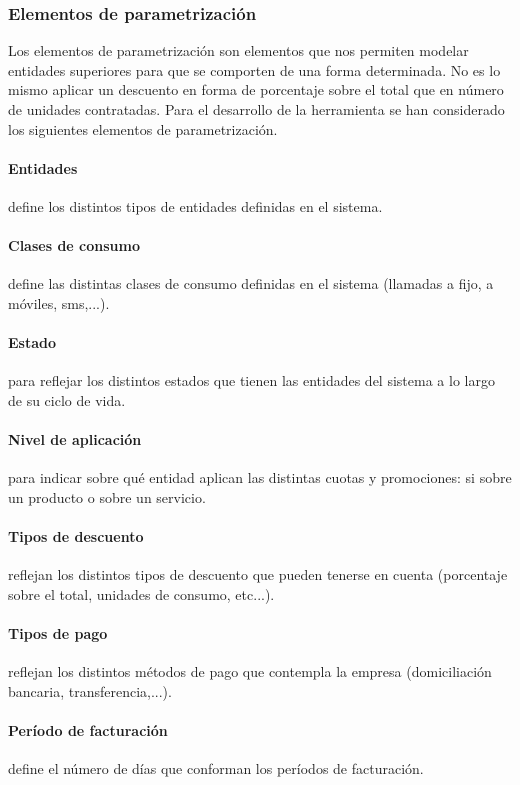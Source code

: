 \subsubsection{Elementos de parametrización}
\label{sub:parametrizacion}
Los elementos de parametrización son elementos que nos permiten modelar entidades superiores para que se comporten de una forma determinada. No es lo mismo aplicar un descuento en forma de porcentaje sobre el total que en número de unidades contratadas. Para el desarrollo de la herramienta se han considerado los siguientes elementos de parametrización.

\paragraph{Entidades} define los distintos tipos de entidades definidas en el sistema.
\paragraph{Clases de consumo} define las distintas clases de consumo definidas en el sistema (llamadas a fijo, a móviles, sms,...).
\paragraph{Estado} para reflejar los distintos estados que tienen las entidades del sistema a lo largo de su ciclo de vida.
\paragraph{Nivel de aplicación} para indicar sobre qué entidad aplican las distintas cuotas y promociones: si sobre un producto o sobre un servicio.
\paragraph{Tipos de descuento} reflejan los distintos tipos de descuento que pueden tenerse en cuenta (porcentaje sobre el total, unidades de consumo, etc...).
\paragraph{Tipos de pago} reflejan los distintos métodos de pago que contempla la empresa (domiciliación bancaria, transferencia,...).
\paragraph{Período de facturación} define el número de días que conforman los  períodos de facturación.
